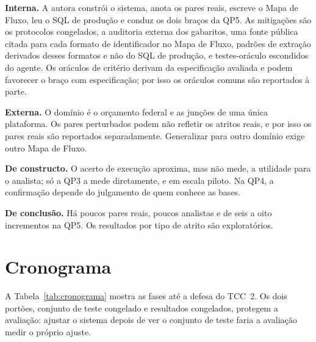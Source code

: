 \textbf{Interna.} A autora constrói o sistema, anota os pares reais, escreve o
Mapa de Fluxo, leu o SQL de produção e conduz os dois braços da QP5. As
mitigações são os protocolos congelados, a auditoria externa dos gabaritos,
uma fonte pública citada para cada formato de identificador no Mapa de Fluxo,
padrões de extração derivados desses formatos e não do SQL de produção, e
testes-oráculo escondidos do agente. Os oráculos de critério derivam da
especificação avaliada e podem favorecer o braço com especificação; por isso
os oráculos comuns são reportados à parte.

\textbf{Externa.} O domínio é o orçamento federal e as junções de uma única
plataforma. Os pares perturbados podem não refletir os atritos reais, e por
isso os pares reais são reportados separadamente. Generalizar para outro
domínio exige outro Mapa de Fluxo.

\textbf{De constructo.} O acerto de execução aproxima, mas não mede, a
utilidade para o analista; só a QP3 a mede diretamente, e em escala piloto.
Na QP4, a confirmação depende do julgamento de quem conhece as bases.

\textbf{De conclusão.} Há poucos pares reais, poucos analistas e de seis a
oito incrementos na QP5. Os resultados por tipo de atrito são exploratórios.

\section{Cronograma}
\label{sec:metodologia-cronograma}

A Tabela~\ref{tab:cronograma} mostra as fases até a defesa do TCC~2. Os dois
portões, conjunto de teste congelado e resultados congelados, protegem a
avaliação: ajustar o sistema depois de ver o conjunto de teste faria a
avaliação medir o próprio ajuste.

